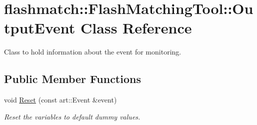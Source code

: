 \hypertarget{classflashmatch_1_1FlashMatchingTool_1_1OutputEvent}{}\section{flashmatch\+:\+:Flash\+Matching\+Tool\+:\+:Output\+Event Class Reference}
\label{classflashmatch_1_1FlashMatchingTool_1_1OutputEvent}


Class to hold information about the event for monitoring.  


\subsection*{Public Member Functions}
\begin{DoxyCompactItemize}
\item 
void \hyperlink{classflashmatch_1_1FlashMatchingTool_1_1OutputEvent_a8c2978d692f26862189e5285c0a5471d}{Reset} (const art\+::\+Event \&event)
\begin{DoxyCompactList}\small\item\em Reset the variables to default dummy values. \end{DoxyCompactList}\end{DoxyCompactItemize}
